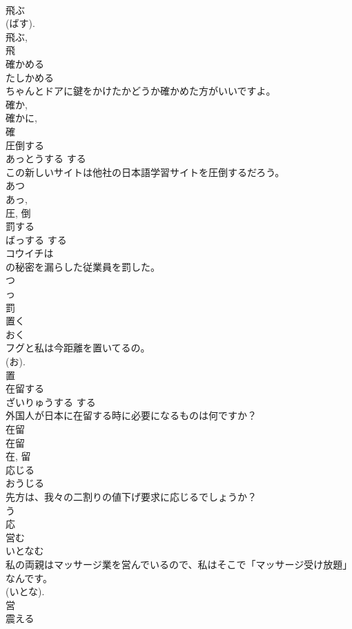 \documentclass[8pt]{extreport}
\begin{document}
\begin{CJK}{UTF8}{min}
\\	飛ぶ 
\\	(ばす). 
\\	飛ぶ, 
\\	飛	
\\	確かめる	
\\	たしかめる	
\\	ちゃんとドアに鍵をかけたかどうか確かめた方がいいですよ。	
\\	確か, 
\\	確かに, 
\\	確	
\\	圧倒する	
\\	あっとうする	する 
\\	この新しいサイトは他社の日本語学習サイトを圧倒するだろう。	
\\	あつ 
\\	あっ, 
\\	圧, 倒	
\\	罰する	
\\	ばっする	する 
\\	コウイチは
\\	の秘密を漏らした従業員を罰した。	
\\	つ 
\\	っ 
\\	罰	
\\	置く	
\\	おく	
\\	フグと私は今距離を置いてるの。	
\\	(お). 
\\	置	
\\	在留する	
\\	ざいりゅうする	する 
\\	外国人が日本に在留する時に必要になるものは何ですか？	
\\	在留 
\\	在留 
\\	在, 留	
\\	応じる	
\\	おうじる	
\\	先方は、我々の二割りの値下げ要求に応じるでしょうか？	
\\	う 
\\	応	
\\	営む	
\\	いとなむ	
\\	私の両親はマッサージ業を営んでいるので、私はそこで「マッサージ受け放題」なんです。	
\\	(いとな).
\\	営	
\\	震える	

\end{CJK}
\end{document}
